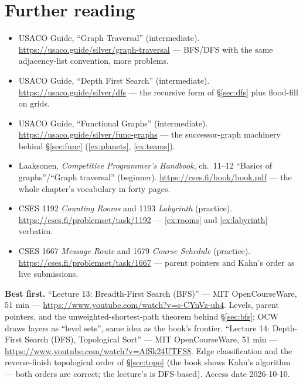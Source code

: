 \section*{Further reading}
\begin{itemize}
\item USACO Guide, ``Graph Traversal'' (intermediate).
\url{https://usaco.guide/silver/graph-traversal} --- BFS/DFS with the
same adjacency-list convention, more problems.
\item USACO Guide, ``Depth First Search'' (intermediate).
\url{https://usaco.guide/silver/dfs} --- the recursive form of
\S\ref{sec:dfs} plus flood-fill on grids.
\item USACO Guide, ``Functional Graphs'' (intermediate).
\url{https://usaco.guide/silver/func-graphs} --- the successor-graph
machinery behind \S\ref{sec:func} (\ref{ex:planets}, \ref{ex:teams}).
\item Laaksonen, \emph{Competitive Programmer's Handbook}, ch.~11--12
``Basics of graphs''/``Graph traversal'' (beginner). \url{https://cses.fi/book/book.pdf}
--- the whole chapter's vocabulary in forty pages.
\item CSES 1192 \emph{Counting Rooms} and 1193 \emph{Labyrinth}
(practice). \url{https://cses.fi/problemset/task/1192} ---
\ref{ex:rooms} and \ref{ex:labyrinth} verbatim.
\item CSES 1667 \emph{Message Route} and 1679 \emph{Course Schedule}
(practice). \url{https://cses.fi/problemset/task/1667} --- parent
pointers and Kahn's order as live submissions.
\end{itemize}

\begin{rulebox}
\smallskip\noindent\textbf{Best first.}
``Lecture 13: Breadth-First Search (BFS)'' --- MIT OpenCourseWare,
51 min --- \url{https://www.youtube.com/watch?v=s-CYnVz-uh4}. Levels,
parent pointers, and the unweighted-shortest-path theorem behind
\S\ref{sec:bfs}; OCW draws layers as ``level sets'', same idea as the
book's frontier.
\smallskip\noindent
``Lecture 14: Depth-First Search (DFS), Topological Sort'' --- MIT
OpenCourseWare, 51 min ---
\url{https://www.youtube.com/watch?v=AfSk24UTFS8}. Edge classification
and the reverse-finish topological order of \S\ref{sec:topo} (the book
shows Kahn's algorithm --- both orders are correct; the lecture's is
DFS-based). Access date 2026-10-10.
\end{rulebox}
